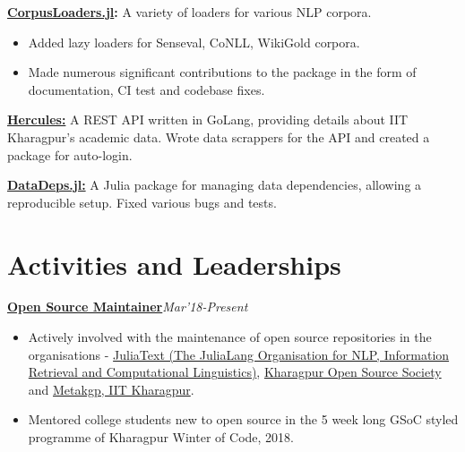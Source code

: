\documentclass[a4paper,10pt]{extarticle} %
\begin{document}
\textbf{\href{https://github.com/JuliaText/CorpusLoaders.jl}{CorpusLoaders.jl}:} A variety of loaders for various NLP corpora.
    \begin{itemize}[leftmargin=.2in]
        \item Added lazy loaders for Senseval, CoNLL, WikiGold corpora.
        \item Made numerous significant contributions to the package in the form of documentation, CI test and codebase fixes.
    \end{itemize}

\textbf{\href{https://github.com/kshitij10496/hercules/}{Hercules:}} A REST API written in GoLang, providing details about IIT Kharagpur's academic data. Wrote data scrappers for the API and created a package for auto-login.

\textbf{\href{https://github.com/oxinabox/DataDeps.jl}{DataDeps.jl:}} A Julia package for managing data dependencies, allowing a reproducible setup. Fixed various bugs and tests.


\section{\textcolor{primary}{Activities and Leaderships}}


\textbf{\href{https://github.com/Ayushk4}{Open Source Maintainer}}\hfill\textit{\small{Mar'18-Present}}
    \begin{itemize}[leftmargin=.15in]
        \item Actively involved with the maintenance of open source repositories in the organisations -  \href{https://github.com/JuliaText}{JuliaText (The JuliaLang Organisation for NLP, Information Retrieval and Computational Linguistics)}, \href{https://github.com/kossiitkgp}{Kharagpur Open Source Society} and \href{https://github.com/metakgp}{Metakgp, IIT Kharagpur}. 
        \item Mentored college students new to open source in the 5 week long GSoC styled programme of Kharagpur Winter of Code, 2018.
    \end{itemize}
\end{document}
